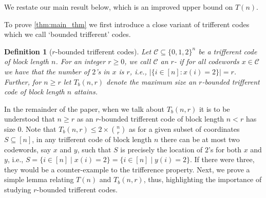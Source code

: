 \documentclass[10pt,a4paper]{article}
\newcommand{\rbdtrifferentcodes}{$r$-bounded trifferent code}
\newcommand{\calC}{\mathcal{C}}
\newcommand{\define}[1]{\textsb{#1}}
\newcommand{\set}[1]{\{#1\}}
\newtheorem{definition}{Definition}[section]
\DeclareMathOperator{\1}{\mathbf{1}}
\begin{document}
We restate our main result below, which is an improved upper bound on $T(n)$.
\maintheorem*



To prove \cref{thm:main_thm} we first introduce a close variant of trifferent codes which we call `bounded trifferent' codes. 

\begin{definition}[\rbdtrifferentcodes{s}]
\label{defn:rbdtriffcodes}
	Let $\calC\subseteq\set{0,1,2}^n$ be a trifferent code of block length $n$.
	For an integer $r\geq 0$, we call $\calC$ an $r$-\define{bounded trifferent code} if for all codewords $x\in \calC$ we have that the number of $2$'s in $x$ is $r$, i.e., $|\set{i\in [n]\colon x(i)=2}|= r$. 
	Further, for $n\geq r$ let $T_b(n,r)$ denote the maximum size an \rbdtrifferentcodes{} of block length $n$ attains.
\end{definition}

In the remainder of the paper, when we talk about $T_b(n,r)$ it is to be understood that $n\geq r$ as an \rbdtrifferentcodes{} of block length $n< r$ has size $0$.
Note that $T_b(n,r)\leq 2\times \binom{n}{r} $ as for a given subset of coordinates $S\subseteq[n]$, in any trifferent code of block length $n$ there can be at most two codewords, say $x$ and $y$, such that $S$ is precisely the location of $2$'s for both $x$ and $y$, i.e., $S = \set{i\in [n]\mid x(i) = 2} = \set{i\in [n]\mid y(i) = 2}$.
If there were three, they would be a counter-example to the trifference property.
Next, we prove a simple lemma relating $T(n)$ and $T_b(n,r)$, thus, highlighting the importance of studying \rbdtrifferentcodes{s}.
\end{document}
